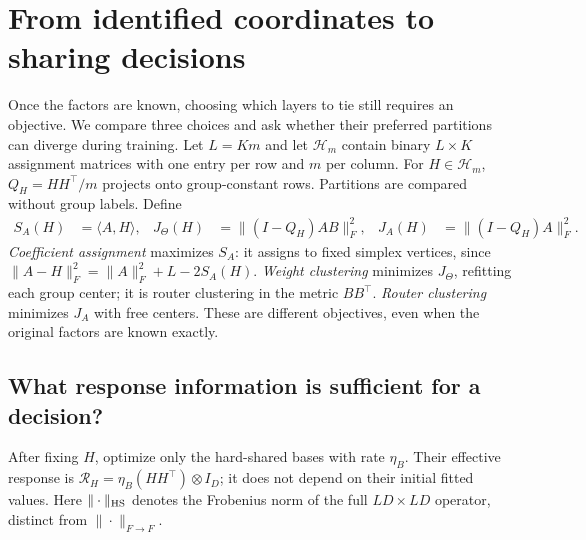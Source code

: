 \section{From identified coordinates to sharing decisions}
\label{sec:sharing-dynamics}

Once the factors are known, choosing which layers to tie still requires
an objective. We compare three choices and ask whether their preferred
partitions can diverge during training. Let $L=Km$ and let $\mathcal H_m$ contain binary $L\times K$
assignment matrices with one entry per row and $m$ per column. For
$H\in\mathcal H_m$, $Q_H=HH^\top/m$ projects onto group-constant rows.
Partitions are compared without group labels. Define
\begin{align}
 S_A(H)&=\langle A,H\rangle, &
 J_\Theta(H)&=\|(I-Q_H)AB\|_F^2, &
 J_A(H)&=\|(I-Q_H)A\|_F^2. \label{eq:three-decisions}
\end{align}
\emph{Coefficient assignment} maximizes $S_A$: it assigns to fixed simplex
vertices, since $\|A-H\|_F^2=\|A\|_F^2+L-2S_A(H)$.
\emph{Weight clustering} minimizes $J_\Theta$, refitting each group center;
it is router clustering in the metric $BB^\top$.
\emph{Router clustering} minimizes $J_A$ with free centers. These are
different objectives, even when the original factors are known exactly.

\subsection{What response information is sufficient for a decision?}

After fixing $H$, optimize only the hard-shared bases with rate $\eta_B$.
Their effective response is
$\mathcal R_H=\eta_B(HH^\top)\otimes I_D$; it does not depend on their
initial fitted values. Here $\|\cdot\|_{\rm HS}$ denotes the Frobenius norm
of the full $LD\times LD$ operator, distinct from $\|\cdot\|_{F\to F}$.


